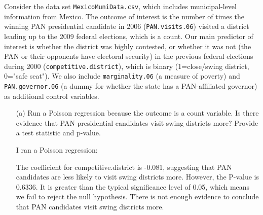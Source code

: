 \documentclass[12pt,letterpaper]{article}
\begin{document}
\noindent Consider the data set \texttt{MexicoMuniData.csv}, which includes municipal-level information from Mexico. The outcome of interest is the number of times the winning PAN presidential candidate in 2006 (\texttt{PAN.visits.06}) visited a district leading up to the 2009 federal elections, which is a count. Our main predictor of interest is whether the district was highly contested, or whether it was not (the PAN or their opponents have electoral security) in the previous federal elections during 2000 (\texttt{competitive.district}), which is binary (1=close/swing district, 0="safe seat"). We also include \texttt{marginality.06} (a measure of poverty) and \texttt{PAN.governor.06} (a dummy for whether the state has a PAN-affiliated governor) as additional control variables. 

\begin{enumerate}
	\item [(a)]
	Run a Poisson regression because the outcome is a count variable. Is there evidence that PAN presidential candidates visit swing districts more? Provide a test statistic and p-value.

I ran a Poisson regression:
	 
	
The coefficient for competitive.district is -0.081, suggesting that PAN candidates are less likely to visit swing districts more. However, the P-value is 0.6336. It is greater than the typical significance level of 0.05, which means we fail to reject the null hypothesis. There is not enough evidence to conclude that PAN candidates visit swing districts more.


\end{enumerate}
\end{document}
